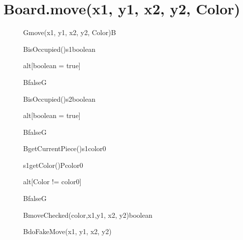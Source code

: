 \documentclass[6pt,landscape]{article}
\begin{document}
\section{Board.move(x1, y1, x2, y2, Color)}
\begin{figure}[H]
	\centering
  	\begin{adjustbox}{width=\textwidth, height=\textheight}
		\begin{sequencediagram}
			
			\begin{call}{G}{move(x1, y1, x2, y2, Color)}{B}{}	
				
				
				\begin{call}{B}{isOccupied()}{s1}{boolean}
				\end{call}
				\begin{sdblock}{alt}{[boolean = true]}
					\begin{messcall}{B}{false}{G}
					\end{messcall} 					  		
				\end{sdblock}
				
				\begin{call}{B}{isOccupied()}{s2}{boolean}
				\end{call}
				\begin{sdblock}{alt}{[boolean = true]}
					\begin{messcall}{B}{false}{G}
					\end{messcall} 					  		
				\end{sdblock}
				
				\begin{call}{B}{getCurrentPiece()}{s1}{color0}
					\begin{call}{s1}{getColor()}{P}{color0}
					\end{call}
				\end{call}
				\begin{sdblock}{alt}{[Color != color0]}
					\begin{messcall}{B}{false}{G}
					\end{messcall} 					  		
				\end{sdblock}
				
				\begin{callself}{B}{moveChecked(color,x1,y1, x2, y2)}{boolean}
					\begin{callself}{B}{doFakeMove(x1, y1, x2, y2)}{}
					\end{callself}
					

\end{callself}
\end{call}
\end{sequencediagram}
\end{adjustbox}
\end{figure}
\end{document}
